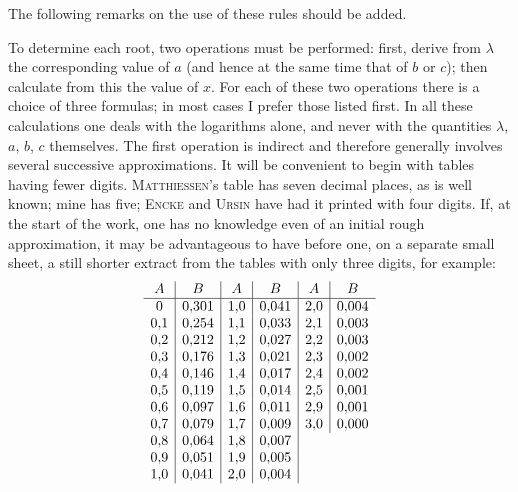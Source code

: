 The following remarks on the use of these rules should be added.

To determine each root, two operations must be performed: first, derive from $\lambda$ the corresponding value of $a$ (and hence at the same time that of $b$ or $c$); then calculate from this the value of $x$. For each of these two operations there is a choice of three formulas; in most cases I prefer those listed first. In all these calculations one deals with the logarithms alone, and never with the quantities $\lambda$, $a$, $b$, $c$ themselves. The first operation is indirect and therefore generally involves several successive approximations. It will be convenient to begin with tables having fewer digits. \textsc{Matthiessen}'s table has seven decimal places, as is well known; mine has five; \textsc{Encke} and \textsc{Ursin} have had it printed with four digits. If, at the start of the work, one has no knowledge even of an initial rough approximation, it may be advantageous to have before one, on a separate small sheet, a still shorter extract from the tables with only three digits, for example:
\[
\begin{array}[t]{c|c|}
A&B\\\hline
0&0{,}301\\
0{,}1&0{,}254\\
0{,}2&0{,}212\\
0{,}3&0{,}176\\
0{,}4&0{,}146\\
0{,}5&0{,}119\\
0{,}6&0{,}097\\
0{,}7&0{,}079\\
0{,}8&0{,}064\\
0{,}9&0{,}051\\
1{,}0&0{,}041
\end{array}
\begin{array}[t]{c|c|}
A&B\\\hline
1{,}0&0{,}041\\
1{,}1&0{,}033\\
1{,}2&0{,}027\\
1{,}3&0{,}021\\
1{,}4&0{,}017\\
1{,}5&0{,}014\\
1{,}6&0{,}011\\
1{,}7&0{,}009\\
1{,}8&0{,}007\\
1{,}9&0{,}005\\
2{,}0&0{,}004
\end{array}
\begin{array}[t]{c|c}
A&B\\\hline
2{,}0&0{,}004\\
2{,}1&0{,}003\\
2{,}2&0{,}003\\
2{,}3&0{,}002\\
2{,}4&0{,}002\\
2{,}5&0{,}001\\
2{,}9&0{,}001\\
3{,}0&0{,}000
\end{array}
\]

